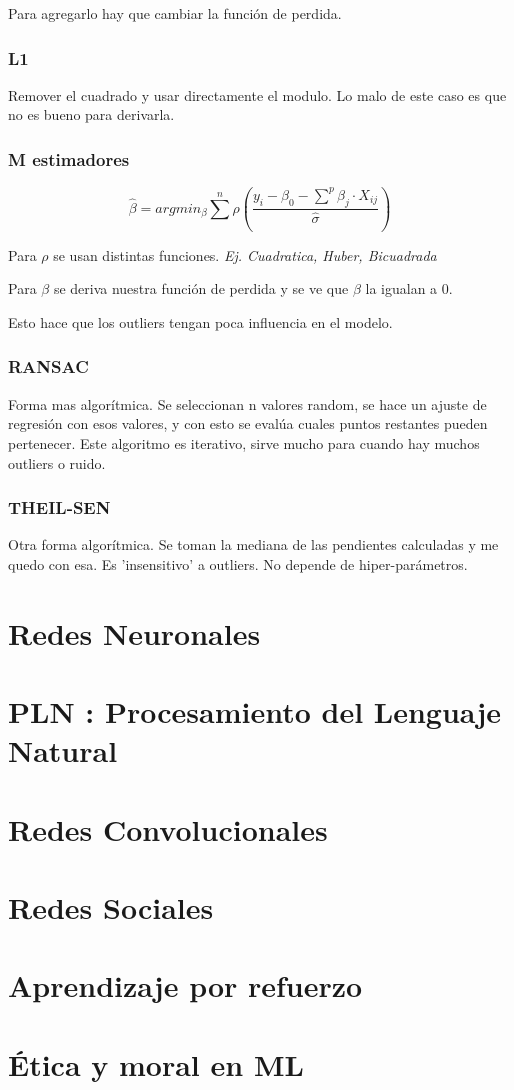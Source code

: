 \documentclass[titlepage,a4paper]{article}
\begin{document}

Para agregarlo hay que cambiar la función de perdida.

\subsubsection{L1}
Remover el cuadrado y usar directamente el modulo. Lo malo de este caso es que no es bueno para derivarla.

\subsubsection{M estimadores}
\begin{equation}
    \hat{\beta} = arg min_\beta \sum^{n} \rho(\frac{ y_{i}-\beta_0-\sum^{p}\beta_j \cdot X_{ij}}{\hat{\sigma}})
\end{equation}

Para $\rho$ se usan distintas funciones. \textit{Ej. Cuadratica, Huber, Bicuadrada}

Para $\beta$ se deriva nuestra función de perdida y se ve que $\beta$ la igualan a 0.

Esto hace que los outliers tengan poca influencia en el modelo.


\subsubsection{RANSAC}
Forma mas algorítmica. Se seleccionan n valores random, se hace un ajuste de regresión con esos valores, y con esto se evalúa cuales puntos restantes pueden pertenecer. Este algoritmo es iterativo, sirve mucho para cuando hay muchos outliers o ruido.


\subsubsection{THEIL-SEN}
Otra forma algorítmica. Se toman la mediana de las pendientes calculadas y me quedo con esa. Es 'insensitivo' a outliers. No depende de hiper-parámetros.


\section{Redes Neuronales}


\section{PLN : Procesamiento del Lenguaje Natural}


\section{Redes Convolucionales}


\section{Redes Sociales}


\section{Aprendizaje por refuerzo}

\section{Ética y moral en ML}
\end{document}
